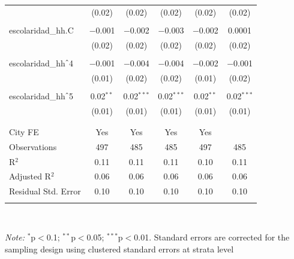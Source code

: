 \begin{table}[H]
\begin{tabularx}{0.9\textwidth}{@{\extracolsep{-7pt}}lccccc}
 & (0.02) & (0.02) & (0.02) & (0.02) & (0.02) \\    & & & & & \\   escolaridad\_hh.C & $-$0.001 & $-$0.002 & $-$0.003 & $-$0.002 & 0.0001 \\    & (0.02) & (0.02) & (0.02) & (0.02) & (0.02) \\    & & & & & \\   escolaridad\_hh$\hat{\mkern6mu}$4 & $-$0.001 & $-$0.004 & $-$0.004 & $-$0.002 & $-$0.001 \\    & (0.01) & (0.02) & (0.02) & (0.01) & (0.02) \\    & & & & & \\   escolaridad\_hh$\hat{\mkern6mu}$5 & 0.02$^{**}$ & 0.02$^{***}$ & 0.02$^{***}$ & 0.02$^{**}$ & 0.02$^{***}$ \\    & (0.01) & (0.01) & (0.01) & (0.01) & (0.01) \\    & & & & & \\  \hline \\[-1.8ex]  City FE & Yes & Yes & Yes & Yes &  \\  Observations & 497 & 485 & 485 & 497 & 485 \\  R$^{2}$ & 0.11 & 0.11 & 0.11 & 0.10 & 0.11 \\  Adjusted R$^{2}$ & 0.06 & 0.06 & 0.06 & 0.06 & 0.06 \\  Residual Std. Error & 0.10 & 0.10 & 0.10 & 0.10 & 0.10 \\  \hline  \hline \\[-1.8ex]  \end{tabularx} \\ \parbox[]{\textwidth}{\textit{Note:} $^{*}$p$<$0.1; $^{**}$p$<$0.05; $^{***}$p$<$0.01. Standard errors are corrected for the sampling design using clustered standard errors at strata level }  \end{table} 